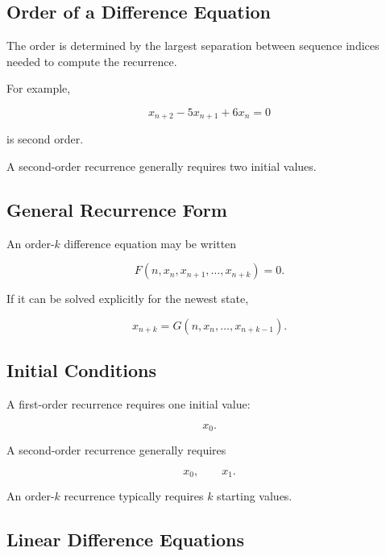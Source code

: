 \subsection{Order of a Difference Equation}
\label{subsec:difference-equation-order}

The order is determined by the largest separation between sequence
indices needed to compute the recurrence.

For example,

\[
\boxed{
x_{n+2}
-
5x_{n+1}
+
6x_n
=
0
}
\]

is second order.

A second-order recurrence generally requires two initial values.

\subsection{General Recurrence Form}
\label{subsec:general-difference-equation-form}

An order-\(k\) difference equation may be written

\[
\boxed{
F
(
n,
x_n,
x_{n+1},
\ldots,
x_{n+k}
)
=
0.
}
\]

If it can be solved explicitly for the newest state,

\[
\boxed{
x_{n+k}
=
G
(
n,
x_n,\ldots,x_{n+k-1}
).
}
\]

\subsection{Initial Conditions}
\label{subsec:difference-equation-initial-conditions}

A first-order recurrence requires one initial value:

\[
\boxed{
x_0.
}
\]

A second-order recurrence generally requires

\[
\boxed{
x_0,
\qquad
x_1.
}
\]

An order-\(k\) recurrence typically requires \(k\) starting values.

\subsection{Linear Difference Equations}
\label{subsec:linear-difference-equations}

